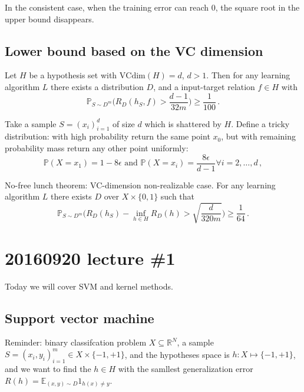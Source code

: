 \documentclass[a4paper]{article}
\newcommand{\Real}{\mathbb{R}}
\newcommand{\ex}{\mathbb{E}}
\newcommand{\pr}{\mathbb{P}}
\begin{document}
In the consistent case, when the training error can reach $0$, the square root
in the upper bound disappears.


\subsection{Lower bound based on the VC dimension} %
\label{sub:lower_bound_based_on_the_vc_dimension}

Let $H$ be a hypothesis set with $\text{VCdim}(H)=d$, $d>1$. Then for any learning
algorithm $L$ there exists a distribution $D$, and a input-target relation $f\in H$
with
\[ \pr_{S\sim D^m} \bigl(R_D(h_S, f) > \frac{d-1}{32m}\bigr) \geq \frac{1}{100} \,. \]

Take a sample $S = (x_i)_{i=1}^d$ of size $d$ which is shattered by $H$. Define a
tricky distribution: with high probability return the same point $x_0$, but with
remaining probability mass return any other point uniformly:
\[ \pr(X=x_1) = 1-8\epsilon
    \text{ and } \pr(X=x_i) = \frac{8\epsilon}{d-1} \forall i=2,\ldots, d
    \,, \]

No-free lunch theorem: VC-dimension non-realizable case. For any learning algorithm $L$
there exists $D$ over $X\times \{0,1\}$ such that
\[ \pr_{S\sim D^m} \biggl(R_D(h_S) - \inf_{h\in H} R_D(h) > \sqrt{\frac{d}{320 m}} \biggr)
    \geq \frac{1}{64}
    \,. \]



%

\section{20160920 lecture \#1} %
\label{sec:20160920_lecture_1}

Today we will cover SVM and kernel methods.

\subsection{Support vector machine} %
\label{sub:support_vector_machine}

Reminder: binary classifcation problem
$X\subseteq \Real^N$, a sample $S = (x_i, y_i)_{i=1}^m \in X\times \{-1, +1\}$, and
the hypotheses space is $h:X \mapsto\{-1, +1\}$, and we want to find the $h\in H$ with
the samllest generalization error $R(h) = \ex_{(x, y)\sim D} 1_{h(x)\neq y}$.
\end{document}
